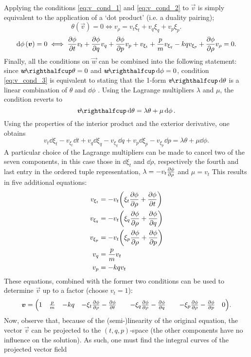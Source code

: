 Applying the conditions \cref{eq:v_cond_1} and \cref{eq:v_cond_2} to $\vec{v}$ is simply equivalent to the application of a `dot product' (i.e. a duality pairing);
$$ \theta(\vec{v}) = 0 \iff v_\rho = v_t\xi_t + v_q\xi_q + v_p\xi_p. $$
$$ \dd{\phi}(\vec{v}) = 0 \iff \pdv{\phi}{t}v_t + \pdv{\phi}{q}v_q + \pdv{\phi}{p}v_p + v_{\xi_t} + \frac{p}{m} v_{\xi_q} - kq v_{\xi_p} + \pdv{\phi}{\rho}v_\rho = 0. $$
Finally, all the conditions on $\vec{w}$ can be combined into the following statement: since $\intpr{\vec{w}}{\theta} = 0$ and $\intpr{\vec{w}}{\dd{\phi}} = 0$, condition \cref{eq:v_cond_3} is equivalent to stating that the 1-form $\intpr{\vec{v}}{\dd{\theta}}$ is a linear combination of $\theta$ and $\dd{\phi}$ \cite{Burke1985}. Using the Lagrange multipliers $\lambda$ and $\mu$, the condition reverts to
$$\intpr{\vec{v}}{\dd{\theta}} = \lambda \theta + \mu \dd{\phi}.$$
Using the properties of the interior product and the exterior derivative, one obtains
$$ v_t\dd{\xi_t} - v_{\xi_t}\dd{t} + v_q\dd{\xi_q} - v_{\xi_q}\dd{q} + v_p\dd{\xi_p} - v_{\xi_p}\dd{p} = \lambda \theta + \mu \dd{\phi}. $$
A particular choice of the Lagrange multipliers can be made to cancel two of the seven components, in this case those in $\dd{\xi_t}$ and $\dd{\rho}$, respectively the fourth and last entry in the ordered tuple representation, $\lambda = -v_t\pdv{\phi}{\rho}$ and $\mu = v_t$ This results in five additional equations:
\begin{equation*}
    \begin{split}
        v_{\xi_t} &= -v_t\qty(\xi_t\pdv{\phi}{\rho} + \pdv{\phi}{t}) \\
        v_{\xi_q} &= -v_t\qty(\xi_q\pdv{\phi}{\rho} + \pdv{\phi}{q}) \\
        v_{\xi_p} &= -v_t\qty(\xi_p\pdv{\phi}{\rho} + \pdv{\phi}{p}) \\
        v_q &= \frac{p}{m}v_t\\
        v_p &= -kq v_t\\
    \end{split}
\end{equation*}
These equations, combined with the former two conditions can be used to determine $\vec{v}$ up to a factor (choose $v_t = 1$):
$$ \vec{v} = \mqty(1 & \frac{p}{m} & -kq 
                   & -\xi_t\pdv{\phi}{\rho} - \pdv{\phi}{t} & 
                   & -\xi_q\pdv{\phi}{\rho} - \pdv{\phi}{q} & 
                   & -\xi_p\pdv{\phi}{\rho} - \pdv{\phi}{p} & 0). $$
Now, observe that, because of the (semi-)linearity of the original equation, the vector $\vec{v}$ can be projected to the $(t, q, p)$-space (the other components have no influence on the solution). As such, one must find the integral curves of the projected vector field
